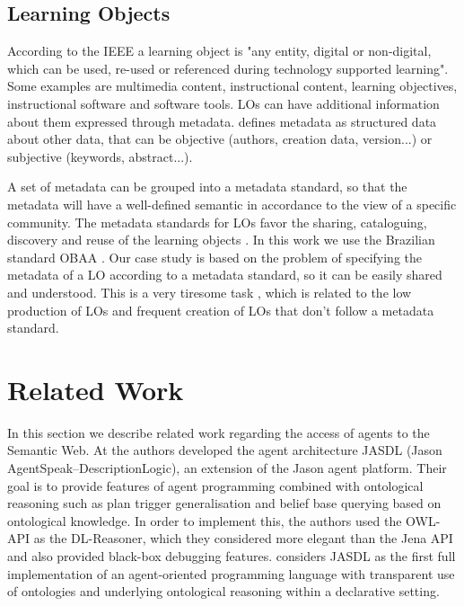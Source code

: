 \documentclass[a4paper,twoside]{article}
\begin{document}
\subsection{Learning Objects}

\noindent According to the IEEE \cite{ref40} a learning object is "any entity, digital or non-digital, which can be used, re-used or referenced during technology supported learning". Some examples are multimedia content, instructional content, learning objectives, instructional software and software tools. LOs can have additional information about them expressed through metadata.
\cite{ref42} defines metadata as structured data about other data, that can be objective (authors, creation data, version...) or subjective (keywords, abstract...). 

A set of metadata can be grouped into a metadata standard, so that the metadata will have a well-defined semantic in accordance to the view of a specific community. The metadata standards for LOs favor the sharing, cataloguing, discovery and reuse of the learning objects \cite{ref42}. In this work we use the Brazilian standard OBAA \cite{refOBAA}. Our case study is based on the problem of specifying the metadata of a LO according to a metadata standard, so it can be easily shared and understood. This is a very tiresome task \cite{ref38}, which is related to the low production of LOs and frequent creation of LOs that don't follow a metadata standard. 

\section{Related Work}
\label{sec:relatedwork}

\noindent In this section we describe related work regarding the access of agents to the Semantic Web. At \cite{refB} the authors developed the agent architecture JASDL (Jason AgentSpeak–DescriptionLogic), an  extension of the Jason agent platform. Their goal is to provide features of agent programming combined with ontological reasoning such as plan trigger generalisation and belief base querying based on ontological knowledge. In order to implement this, the authors used the OWL-API as the DL-Reasoner, which they considered more elegant than the Jena API and also provided black-box debugging features. \cite{refB} considers JASDL as the first full implementation of an agent-oriented programming language with transparent use of ontologies and underlying ontological reasoning within a declarative setting.
\end{document}
